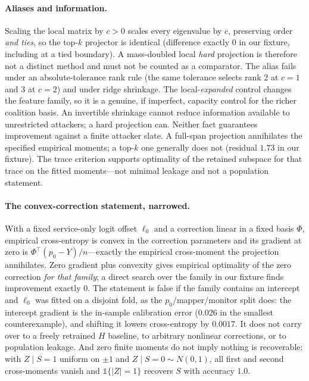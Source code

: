 \documentclass[10pt]{article}
\begin{document}
\paragraph{Aliases and information.} Scaling the local matrix by $c>0$ scales every eigenvalue by $c$,
preserving order \emph{and ties}, so the top-$k$ projector is identical (difference exactly $0$ in our
fixture, including at a tied boundary). A mass-doubled local \emph{hard} projection is therefore not a
distinct method and must not be counted as a comparator. The alias fails under an absolute-tolerance rank
rule (the same tolerance selects rank 2 at $c=1$ and 3 at $c=2$) and under ridge shrinkage. The
local-\emph{expanded} control changes the feature family, so it is a genuine, if imperfect, capacity
control for the richer coalition basis. An invertible shrinkage cannot reduce information available to
unrestricted attackers; a hard projection can. Neither fact guarantees improvement against a finite
attacker slate. A full-span projection annihilates the specified empirical moments; a top-$k$ one
generally does not (residual $1.73$ in our fixture). The trace criterion supports optimality of the
retained subspace for that trace on the fitted moments---not minimal leakage and not a population statement.

\paragraph{The convex-correction statement, narrowed.} With a fixed service-only logit offset $\ell_0$ and a
correction linear in a fixed basis $\Phi$, empirical cross-entropy is convex in the correction parameters
and its gradient at zero is $\Phi^\top(p_0-Y)/n$---exactly the empirical cross-moment the projection
annihilates. Zero gradient plus convexity gives empirical optimality of the zero correction \emph{for that
family}; a direct search over the family in our fixture finds improvement exactly $0$. The statement is
false if the family contains an intercept and $\ell_0$ was fitted on a disjoint fold, as the
$p_0$/mapper/monitor split does: the intercept gradient is the in-sample calibration error ($0.026$ in the
smallest counterexample), and shifting it lowers cross-entropy by $0.0017$. It does not carry over to a
freely retrained $H$ baseline, to arbitrary nonlinear corrections, or to population leakage. And zero
finite moments do not imply nothing is recoverable: with $Z\mid S{=}1$ uniform on $\pm1$ and
$Z\mid S{=}0\sim N(0,1)$, all first and second cross-moments vanish and $\mathbb{1}\{|Z|=1\}$ recovers $S$
with accuracy $1.0$.
\end{document}
